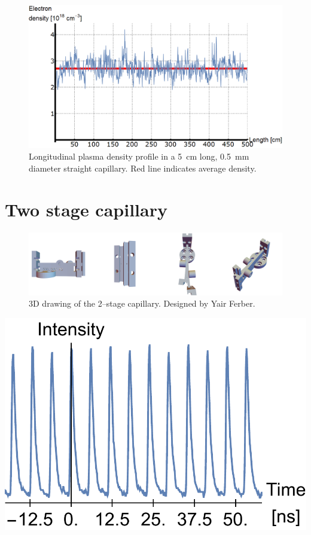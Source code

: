 \documentclass[../main.tex]{subfiles}
\begin{document}
\begin{figure}[b]
    \centering
    \includegraphics[width=\textwidth]{figures/spectro/longitudinal_profile.png}
    \caption{Longitudinal plasma density profile in a \SI{5}{\cm} long, \SI{0.5}{\mm} diameter straight capillary. Red line indicates average density.}
    \label{fig:longi_profile}
\end{figure}

\section{Two stage capillary}

\begin{figure}
    \centering
    \includegraphics[width=\textwidth]{figures/cad/doublecapillary_cad.png}
    \caption{3D drawing of the 2--stage capillary. Designed by Yair Ferber.}
    \label{fig:doublecapillaryCAD}
\end{figure}

\begin{marginfigure}
\includegraphics[width=\marginparwidth]{figures/oscillator/double.pdf}
\label{fig:oscillator_double}
\caption{Two \SI{84}{\MHz} temporal beam profiles of the oscillator laser, one delayed with respect to the other.}
\end{marginfigure}
\end{document}
